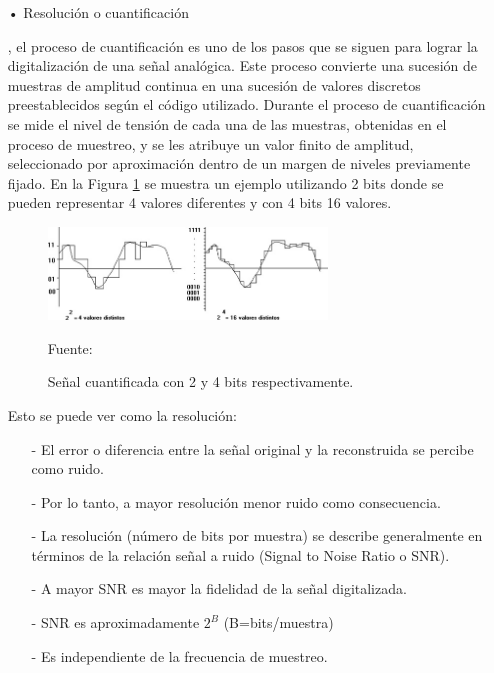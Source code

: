 \begin{enumerate}
\begin{enumerate}
\item[•]Resolución o cuantificación
\par
\cite{manfred}, el proceso de cuantificación es uno de los pasos que se siguen para lograr la digitalización de una señal analógica. Este proceso convierte una sucesión de muestras de amplitud continua en una sucesión de valores discretos preestablecidos según el código utilizado.
\vskip 0.5cm
Durante el proceso de cuantificación se mide el nivel de tensión de cada una de las muestras, obtenidas en el proceso de muestreo, y se les atribuye un valor finito de amplitud, seleccionado por aproximación dentro de un margen de niveles previamente fijado.
\vskip 0.5cm
En la Figura \ref{fig:figura2.11} se muestra un ejemplo utilizando 2 bits donde se pueden representar 4 valores diferentes y con 4 bits 16 valores.
\vskip 0.5cm
\begin{figure}[ht]
\begin{center}
\includegraphics[width=0.7\textwidth]{Imagenes/Cap2/image011}
\end{center}
\begin{center}
\vskip -0.5cm
\caption{\small{Señal cuantificada con 2 y 4 bits respectivamente.}}
\label{fig:figura2.11}
{\small{Fuente: \cite{eyra}}}
\end{center}
\end{figure}

Esto se puede ver como la resolución:
\begin{enumerate}
\item[-]El error o diferencia entre la señal original y la reconstruida se percibe como ruido.
\item[-]Por lo tanto, a mayor resolución menor ruido como consecuencia.
\item[-]La resolución (número de bits por muestra) se describe generalmente en términos de la relación señal a ruido (Signal to Noise Ratio o SNR).
\item[-]A mayor SNR es mayor la fidelidad de la señal digitalizada.
\item[-]SNR es aproximadamente $2^B$ (B=bits/muestra)
\item[-]Es independiente de la frecuencia de muestreo.
\end{enumerate}


\end{enumerate}
\end{enumerate}
